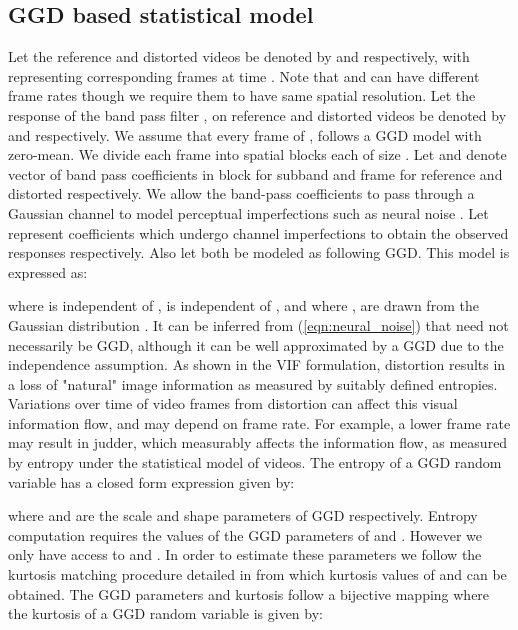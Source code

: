 \documentclass[journal]{IEEEtran}
\begin{document}
\vspace{-7pt}
\subsection{GGD based statistical model}
\label{subsec:GGD_model}
Let the reference and distorted videos be denoted by  and  respectively, with  representing corresponding frames at time . Note that  and  can have different frame rates though we require them to have same spatial resolution. Let the response of the  band pass filter ,  on reference and distorted videos be denoted by  and  respectively. We assume that every frame of ,  follows a GGD model with zero-mean. We divide each frame into  spatial blocks each of size . Let  and  denote vector of band pass coefficients in block  for subband  and frame  for reference and distorted respectively. We allow the band-pass coefficients to pass through a Gaussian channel to model perceptual imperfections such as neural noise \cite{sheikh2006image,soundararajan2012video}. Let  represent coefficients which undergo channel imperfections to obtain the observed responses  respectively. Also let  both be modeled as following GGD. This model is expressed as:

where  is independent of ,  is independent of , and where ,  are drawn from the Gaussian distribution . It can be inferred from (\ref{eqn:neural_noise}) that  need not necessarily be GGD, although it can be well approximated by a GGD \cite{zhao2004sum} due to the independence assumption. As shown in the VIF \cite{sheikh2006image} formulation, distortion results in a loss of "natural" image information as measured by suitably defined entropies. Variations over time of video frames from distortion can affect this visual information flow, and may depend on frame rate. For example, a lower frame rate may result in judder, which measurably affects the information flow, as measured by entropy under the statistical model of videos. The entropy of a GGD random variable  has a closed form expression given by:

where  and  are the scale and shape parameters of GGD respectively. Entropy computation requires the values of the GGD parameters of  and . However we only have access to  and . In order to estimate these parameters we follow the kurtosis matching procedure detailed in \cite{soury2015new} from which kurtosis values of and  can be obtained. The GGD parameters and kurtosis follow a bijective mapping \cite{soury2015new} where the kurtosis of a GGD random variable is given by:
\end{document}

